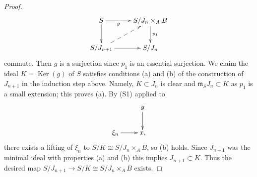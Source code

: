 \documentclass{amsart}
\theoremstyle{plain}
\theoremstyle{definition}
\theoremstyle{remark}
\numberwithin{equation}{subsection}
\def\Ker{\mathop{\mathrm{Ker}}}
\begin{document}
\begin{proof}
$$
\xymatrix{
S \ar[d] \ar[r]_-g  &  S/J_n \times_A B \ar[d]^{p_1} \\
S/J_{n + 1} \ar@{-->}[ur] \ar[r] &  S/J_n
}
$$
commute. Then $g$ is a surjection since $p_1$ is an essential surjection.
We claim the ideal $K = \Ker(g)$ of $S$ satisfies conditions (a) and
(b) of the construction of $J_{n + 1}$ in the induction step above.
Namely, $K \subset J_n$ is clear and $\mathfrak m_SJ_n \subset K$ as $p_1$
is a small extension; this proves (a). By (S1) applied to
$$
\xymatrix{
            &  y \ar[d] \\
\xi_n \ar[r]  &  x,
}
$$
there exists a lifting of $\xi_n$ to $S/K \cong S/J_n \times_A B$, so (b)
holds. Since $J_{n + 1}$ was the minimal ideal with properties (a) and (b)
this implies $J_{n + 1} \subset K$. Thus the desired map
$S/J_{n+1} \to S/K \cong S/J_n \times_A B$ exists.
\end{proof}
\end{document}
